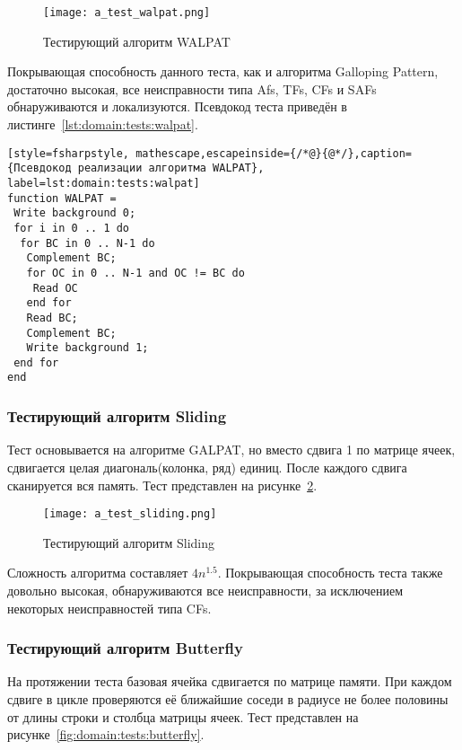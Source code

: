 \begin{figure}[ht]
\centering
  \texttt{[image: a\_test\_walpat.png]}  
  \caption{Тестирующий алгоритм WALPAT}
  \label{fig:domain:tests:walpat}
\end{figure}

Покрывающая способность данного теста, как и алгоритма Galloping Pattern, достаточно высокая, все неисправности типа Afs, TFs, CFs и SAFs обнаруживаются и локализуются. Псевдокод теста приведён в листинге~\ref{lst:domain:tests:walpat}.

\begin{lstlisting}[style=fsharpstyle, mathescape,escapeinside={/*@}{@*/},caption={Псевдокод реализации алгоритма WALPAT}, label=lst:domain:tests:walpat]
function WALPAT =
 Write background 0;
 for i in 0 .. 1 do
  for BC in 0 .. N-1 do
   Complement BC;
   for OC in 0 .. N-1 and OC != BC do
    Read OC
   end for
   Read BC;
   Complement BC;
   Write background 1;
 end for
end
\end{lstlisting}

\subsubsection{Тестирующий алгоритм Sliding}
\label{sub:domain:tests:sliding}
Тест основывается на алгоритме GALPAT, но вместо сдвига 1 по матрице ячеек, сдвигается целая диагональ(колонка, ряд) единиц. После каждого сдвига сканируется вся память. Тест представлен на рисунке~\ref{fig:domain:tests:sliding}.

\begin{figure}[ht]
\centering
  \texttt{[image: a\_test\_sliding.png]}  
  \caption{Тестирующий алгоритм Sliding}
  \label{fig:domain:tests:sliding}
\end{figure} 

Сложность алгоритма составляет $ 4n^{1.5} $. Покрывающая способность теста также довольно высокая, обнаруживаются все неисправности, за исключением некоторых неисправностей типа CFs.

\subsubsection{Тестирующий алгоритм Butterfly}
\label{sub:domain:tests:butterfly}
На протяжении теста базовая ячейка сдвигается по матрице памяти. При каждом сдвиге в цикле проверяются её ближайшие соседи в радиусе не более половины от длины строки и столбца матрицы ячеек. Тест представлен на рисунке~\ref{fig:domain:tests:butterfly}. 

